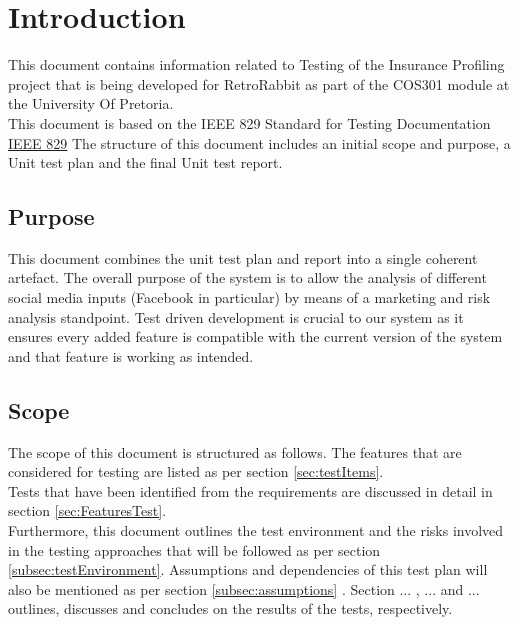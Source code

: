 \documentclass{article}
\begin{document}
	\cleardoublepage
	\tableofcontents
	\cleardoublepage
	
\section{Introduction}
This document contains information related to Testing of the Insurance Profiling project that is being developed for RetroRabbit as part of the COS301 module at the University Of Pretoria. \\
This document is based on the IEEE 829 Standard for Testing Documentation \href{http://www.fit.vutbr.cz/study/courses/ITS/public/ieee829.html}{IEEE 829}
The structure of this document includes an initial scope and purpose, a Unit test plan and the final Unit test report.
\subsection{Purpose}
This document combines the unit test plan and report into a single coherent artefact. The overall purpose of the system is to allow the analysis of different social media inputs (Facebook in particular) by means of a marketing and risk analysis standpoint.
Test driven development is crucial to our system as it ensures every added feature is compatible with the current version of the system and that feature is working as intended.
\subsection{Scope}
The scope of this document is structured as follows. The features that are considered for testing are listed as per section \ref{sec:testItems}. \\
Tests that have been identified from the requirements are
discussed in detail in section \ref{sec:FeaturesTest}.\\
Furthermore, this document outlines the test environment and the risks involved in the testing approaches that will be followed as per section \ref{subsec:testEnvironment}. Assumptions and dependencies of this test plan will also be mentioned as per section \ref{subsec:assumptions} . Section ... , ... and ...  outlines, discusses and concludes on the results of the tests, respectively.
\end{document}
